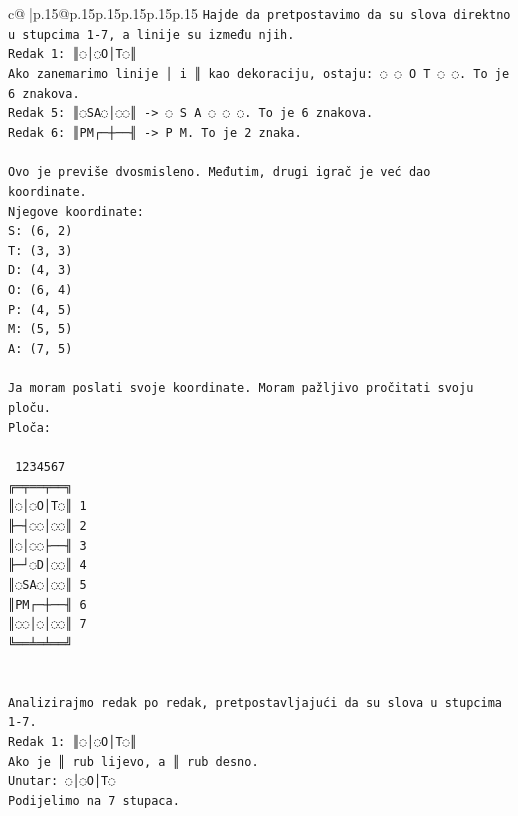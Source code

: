 \documentclass{article}
\begin{document}
{\begin{supertabular}{c@{$\;$}|p{.15\linewidth}@{}p{.15\linewidth}p{.15\linewidth}p{.15\linewidth}p{.15\linewidth}p{.15\linewidth}}
{{{\texttt{Hajde da pretpostavimo da su slova direktno u stupcima 1{-}7, a linije su između njih.} \\
\texttt{Redak 1: ║◌│◌O│T◌║} \\
\texttt{Ako zanemarimo linije │ i ║ kao dekoraciju, ostaju: ◌ ◌ O T ◌ ◌. To je 6 znakova.} \\
\texttt{Redak 5: ║◌SA◌│◌◌║ {-}> ◌ S A ◌ ◌ ◌. To je 6 znakova.} \\
\texttt{Redak 6: ║PM┌─┼──╢ {-}> P M. To je 2 znaka.} \\
\\ 
\texttt{Ovo je previše dvosmisleno. Međutim, drugi igrač je već dao koordinate.} \\
\texttt{Njegove koordinate:} \\
\texttt{S: (6, 2)} \\
\texttt{T: (3, 3)} \\
\texttt{D: (4, 3)} \\
\texttt{O: (6, 4)} \\
\texttt{P: (4, 5)} \\
\texttt{M: (5, 5)} \\
\texttt{A: (7, 5)} \\
\\ 
\texttt{Ja moram poslati svoje koordinate. Moram pažljivo pročitati svoju ploču.} \\
\texttt{Ploča:} \\
\\ 
\texttt{ 1234567} \\
\texttt{╔═╤══╤══╗} \\
\texttt{║◌│◌O│T◌║ 1} \\
\texttt{╟─┤◌◌│◌◌║ 2} \\
\texttt{║◌│◌◌├──╢ 3} \\
\texttt{╟─┘◌D│◌◌║ 4} \\
\texttt{║◌SA◌│◌◌║ 5} \\
\texttt{║PM┌─┼──╢ 6} \\
\texttt{║◌◌│◌│◌◌║ 7} \\
\texttt{╚══╧═╧══╝} \\
\\ 
\\ 
\texttt{Analizirajmo redak po redak, pretpostavljajući da su slova u stupcima 1{-}7.} \\
\texttt{Redak 1: ║◌│◌O│T◌║} \\
\texttt{Ako je ║ rub lijevo, a ║ rub desno.} \\
\texttt{Unutar: ◌│◌O│T◌} \\
\texttt{Podijelimo na 7 stupaca.} \\
}}}
\end{supertabular}}
\end{document}
